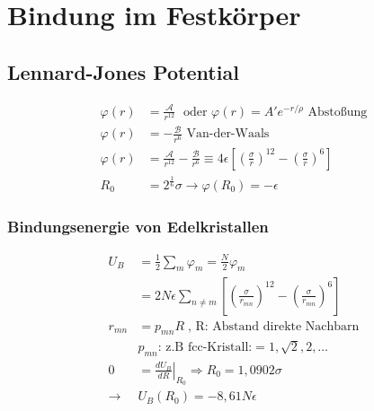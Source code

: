 \section{Bindung im Festkörper}

\subsection*{Lennard-Jones Potential}
\begin{equation*}
    \begin{aligned}
        \varphi(r) &= \frac{\mathcal{A}}{r^{12}} \; \text{ oder } \varphi(r) = A' e^{-r/\rho}  \text{ Abstoßung} \\
        \varphi(r) &= - \frac{\mathcal{B}}{r^6} \text{ Van-der-Waals} \\
        \varphi(r) &= \frac{\mathcal{A}}{r^{12}} - \frac{\mathcal{B}}{r^6} \equiv 4 \epsilon \left[\left(\frac{\sigma}{r}\right)^{12}-\left(\frac{\sigma}{r}\right)^6\right] \\
        R_0 &= 2^{\frac{1}{6}} \sigma \rightarrow \varphi(R_0) = - \epsilon
    \end{aligned}
\end{equation*}

\subsubsection*{Bindungsenergie von Edelkristallen}
\begin{equation*}
    \begin{aligned}
        U_B &= \frac{1}{2} \sum_m \varphi_m = \frac{N}{2} \varphi_m \\
            &= 2N\epsilon \sum_{n \neq m} \left[\left(\frac{\sigma}{r_{mn}}\right)^{12}- \left(\frac{\sigma}{r_{mn}}\right)^6\right] \\
        r_{mn} &= p_{mn} R \; \text{, R: Abstand direkte Nachbarn}\\
            & p_{mn} \text{: z.B fcc-Kristall:} = 1, \sqrt{2}, 2, \dots \\
        0 &= \left. \frac{dU_B}{dR} \right|_{R_0} \Rightarrow R_0 = 1,0902 \sigma \\
        \rightarrow &U_B (R_0 ) = -8,61 N \epsilon
    \end{aligned}  
\end{equation*}


